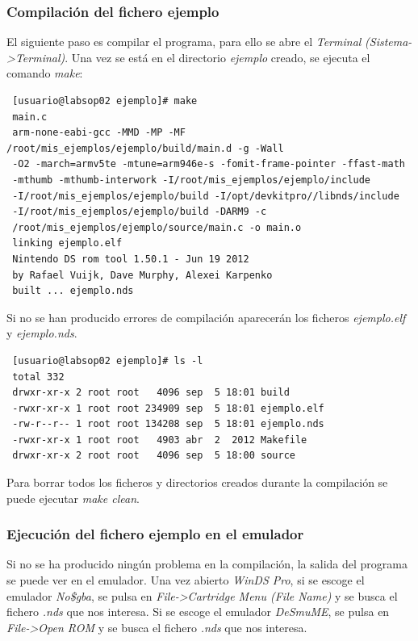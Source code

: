 \subsubsection{Compilación del fichero ejemplo}
El siguiente paso es compilar el programa, para ello se abre el \textit{Terminal} \textit{(Sistema->Terminal)}. Una vez se está en el directorio \textit{ejemplo} creado, se ejecuta el comando \textit{make}:
\begin{verbatim}
 [usuario@labsop02 ejemplo]# make
 main.c
 arm-none-eabi-gcc -MMD -MP -MF /root/mis_ejemplos/ejemplo/build/main.d -g -Wall 
 -O2 -march=armv5te -mtune=arm946e-s -fomit-frame-pointer -ffast-math 
 -mthumb -mthumb-interwork -I/root/mis_ejemplos/ejemplo/include 
 -I/root/mis_ejemplos/ejemplo/build -I/opt/devkitpro//libnds/include 
 -I/root/mis_ejemplos/ejemplo/build -DARM9 -c 
 /root/mis_ejemplos/ejemplo/source/main.c -o main.o 
 linking ejemplo.elf
 Nintendo DS rom tool 1.50.1 - Jun 19 2012
 by Rafael Vuijk, Dave Murphy, Alexei Karpenko
 built ... ejemplo.nds
\end{verbatim}

Si no se han producido errores de compilación aparecerán los ficheros \textit{ejemplo.elf} y \textit{ejemplo.nds}.
\begin{verbatim}
 [usuario@labsop02 ejemplo]# ls -l
 total 332
 drwxr-xr-x 2 root root   4096 sep  5 18:01 build
 -rwxr-xr-x 1 root root 234909 sep  5 18:01 ejemplo.elf
 -rw-r--r-- 1 root root 134208 sep  5 18:01 ejemplo.nds
 -rwxr-xr-x 1 root root   4903 abr  2  2012 Makefile
 drwxr-xr-x 2 root root   4096 sep  5 18:00 source
                \end{verbatim}
Para borrar todos los ficheros y directorios creados durante la compilación se puede ejecutar \textit{make clean}.

\subsubsection{Ejecución del fichero ejemplo en el emulador}
Si no se ha producido ningún problema en la compilación, la salida del programa se puede ver en el emulador. Una vez abierto \textit{WinDS Pro}, si se escoge el emulador \textit{No\$gba}, se pulsa en \textit{File->Cartridge Menu (File Name)} y se busca el fichero \textit{.nds} que nos interesa. Si se escoge el emulador \textit{DeSmuME}, se pulsa en \textit{File->Open ROM} y se busca el fichero \textit{.nds} que nos interesa.


